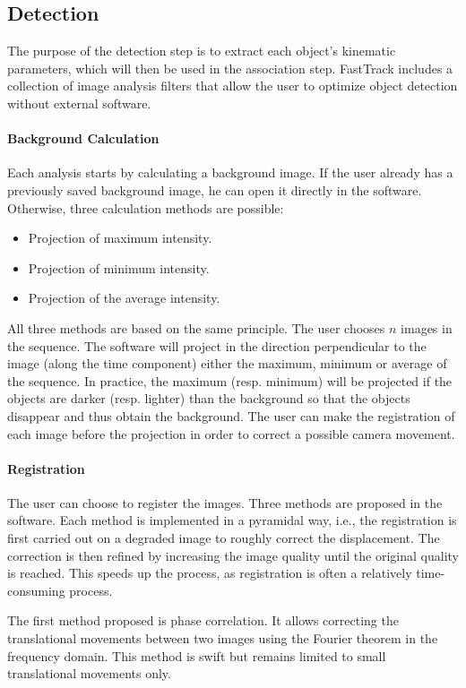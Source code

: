 	
		\subsection{Detection}
		The purpose of the detection step is to extract each object's kinematic parameters, which will then be used in the association step. FastTrack includes a collection of image analysis filters that allow the user to optimize object detection without external software.
		\paragraph{Background Calculation}
		Each analysis starts by calculating a background image. If the user already has a previously saved background image, he can open it directly in the software. Otherwise, three calculation methods are possible:
		\begin{itemize}
			\item Projection of maximum intensity.
			\item Projection of minimum intensity.
			\item Projection of the average intensity.
		\end{itemize}
		All three methods are based on the same principle. The user chooses $n$ images in the sequence. The software will project in the direction perpendicular to the image (along the time component) either the maximum, minimum or average of the sequence. In practice, the maximum (resp. minimum) will be projected if the objects are darker (resp. lighter) than the background so that the objects disappear and thus obtain the background. The user can make the registration of each image before the projection in order to correct a possible camera movement.
		
		\paragraph{Registration}
		The user can choose to register the images. Three methods are proposed in the software. Each method is implemented in a pyramidal way, i.e., the registration is first carried out on a degraded image to roughly correct the displacement. The correction is then refined by increasing the image quality until the original quality is reached. This speeds up the process, as registration is often a relatively time-consuming process.


		The first method proposed is phase correlation. It allows correcting the translational movements between two images using the Fourier theorem in the frequency domain. This method is swift but remains limited to small translational movements only.


